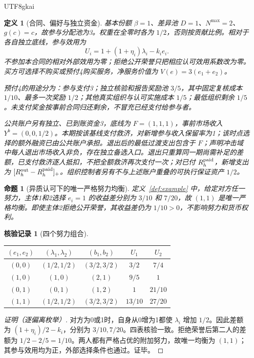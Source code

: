 \documentclass[12pt,a4paper,openany]{report}
\newtheorem{definition}{定义}[chapter]
\newtheorem{proposition}{命题}[chapter]
\newtheorem{Certificate}{核验记录}[chapter]
\begin{document}
\begin{CJK*}{UTF8}{gkai}
\begin{definition}[合同、偏好与独立资金]
基本份额 $\beta=1$、差异池 $D=1$、$N^{\max}=2$、$g(c)=c$，故参与分配池为3。权重在全零时各为 $1/2$，否则按贡献比例。相对于各自独立底线，参与效用为
\[
 U_i=1+(1+\eta_i)\lambda_i-k_ie_i.
\]
不参加本合同的相对外部效用为零；拒绝公开荣誉只把相应认可效用系数改为零。买方可选择不购买或预付4购买服务，净服务价值为 $V(e)=3(e_1+e_2)$。

预付4的用途分为：参与支付3；独立核验和报告奖励池 $3/5$，其中固定复核成本 $1/10$、最多一次奖励 $1/2$；其他真实组织与认可实施成本 $1/5$；最低组织剩余 $1/5$。未支付奖金按事前合同归还剩余，不冒充已经支付给参与者。

公共账户另有独立、已到账资金3，底线为 $F=(1,1,1)$，事前市场收入 $Y^b=(0,0,1/2)$。本期按该基线支付救济，对新增参与收入保留率为1；该时点选择的额外融资已由公共账户承担。退出后的最低过渡支出包含于 $F$；声明冲击域中每人退出市场收入非负，存在独立备选入口。退出只重算同一期尚需补足的差额，已支付救济逐人抵扣，不把全额救济再次支付一次；对已付 $R_h^{\rm paid}$，新增支出为 $[R_h^{\rm out}-R_h^{\rm paid}]_+$。组织控制者另有不与上述账户重叠的可执行保证资产 $1/2$。
\end{definition}

\begin{proposition}[异质认可下的唯一严格努力均衡]
\label{prop:example-equilibrium}
定义~\ref{def:example} 中，给定对方任一努力，主体1和2选择 $e_i=1$ 的收益差分别为 $3/10$ 和 $7/20$，故 $(1,1)$ 是唯一严格均衡。即使主体2拒绝公开荣誉，其收益差仍为 $1/10>0$，不影响努力和货币权利。
\end{proposition}
\begin{Certificate}[四个努力组合]
\leavevmode\par
\begin{center}
\begin{tabular}{ccccc}
\toprule
$(e_1,e_2)$ & $(\lambda_1,\lambda_2)$ & $(b_1,b_2)$ & $U_1$ & $U_2$\\
\midrule
$(0,0)$ & $(1/2,1/2)$ & $(3/2,3/2)$ & $3/2$ & $7/4$\\
$(1,0)$ & $(1,0)$ & $(2,1)$ & $9/5$ & $1$\\
$(0,1)$ & $(0,1)$ & $(1,2)$ & $1$ & $21/10$\\
$(1,1)$ & $(1/2,1/2)$ & $(3/2,3/2)$ & $13/10$ & $27/20$\\
\bottomrule
\end{tabular}
\end{center}
\end{Certificate}
\begin{proof}[证明（逐偏离枚举）]
对方为0或1时，自身从0增为1都使 $\lambda_i$ 增加 $1/2$。因此差额为 $(1+\eta_i)/2-k_i$，分别为 $3/10,7/20$。四表核验一致。拒绝荣誉后第二人的差额为 $1/2-2/5=1/10$。两人都有严格占优的附加努力，故唯一均衡为 $(1,1)$；其参与效用均为正，外部选择条件也通过。证毕。
\end{proof}


\end{CJK*}
\end{document}
